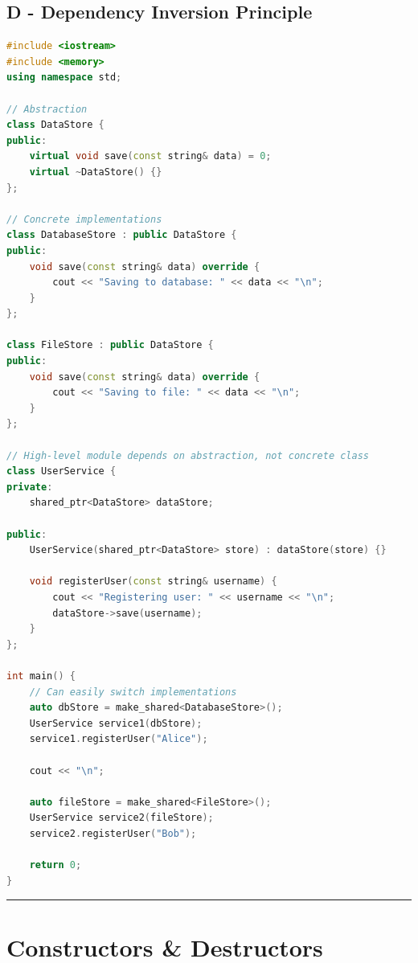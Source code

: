 \hypertarget{d---dependency-inversion-principle}{%
\subsection{D - Dependency Inversion
Principle}\label{d---dependency-inversion-principle}}

\begin{lstlisting}[language={C++}]
#include <iostream>
#include <memory>
using namespace std;

// Abstraction
class DataStore {
public:
    virtual void save(const string& data) = 0;
    virtual ~DataStore() {}
};

// Concrete implementations
class DatabaseStore : public DataStore {
public:
    void save(const string& data) override {
        cout << "Saving to database: " << data << "\n";
    }
};

class FileStore : public DataStore {
public:
    void save(const string& data) override {
        cout << "Saving to file: " << data << "\n";
    }
};

// High-level module depends on abstraction, not concrete class
class UserService {
private:
    shared_ptr<DataStore> dataStore;
    
public:
    UserService(shared_ptr<DataStore> store) : dataStore(store) {}
    
    void registerUser(const string& username) {
        cout << "Registering user: " << username << "\n";
        dataStore->save(username);
    }
};

int main() {
    // Can easily switch implementations
    auto dbStore = make_shared<DatabaseStore>();
    UserService service1(dbStore);
    service1.registerUser("Alice");
    
    cout << "\n";
    
    auto fileStore = make_shared<FileStore>();
    UserService service2(fileStore);
    service2.registerUser("Bob");
    
    return 0;
}
\end{lstlisting}

\begin{center}\rule{0.5\linewidth}{0.5pt}\end{center}

\hypertarget{constructors-destructors}{%
\section{Constructors \& Destructors}\label{constructors-destructors}}

